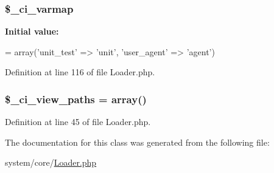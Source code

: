 \hypertarget{class_c_i___loader_a8dd33a8ab99688451b1f811f122d1114}{
\subsubsection[{\$\-\_\-ci\-\_\-varmap}]{\setlength{\rightskip}{0pt plus 5cm}\$\-\_\-ci\-\_\-varmap\hspace{0.3cm}{\ttfamily [protected]}}}\label{class_c_i___loader_a8dd33a8ab99688451b1f811f122d1114}
{\bfseries Initial value\-:}
\begin{DoxyCode}
= array(\textcolor{stringliteral}{'unit\_test'} => \textcolor{stringliteral}{'unit'},
                                            \textcolor{stringliteral}{'user\_agent'} => \textcolor{stringliteral}{'agent'})
\end{DoxyCode}


Definition at line 116 of file Loader.\-php.

\hypertarget{class_c_i___loader_adc48c64c673b28c2447ea4214a27eeea}{
\subsubsection[{\$\-\_\-ci\-\_\-view\-\_\-paths}]{\setlength{\rightskip}{0pt plus 5cm}\$\-\_\-ci\-\_\-view\-\_\-paths = array()\hspace{0.3cm}{\ttfamily [protected]}}}\label{class_c_i___loader_adc48c64c673b28c2447ea4214a27eeea}


Definition at line 45 of file Loader.\-php.



The documentation for this class was generated from the following file\-:\begin{DoxyCompactItemize}
\item 
system/core/\hyperlink{_loader_8php}{Loader.\-php}\end{DoxyCompactItemize}
